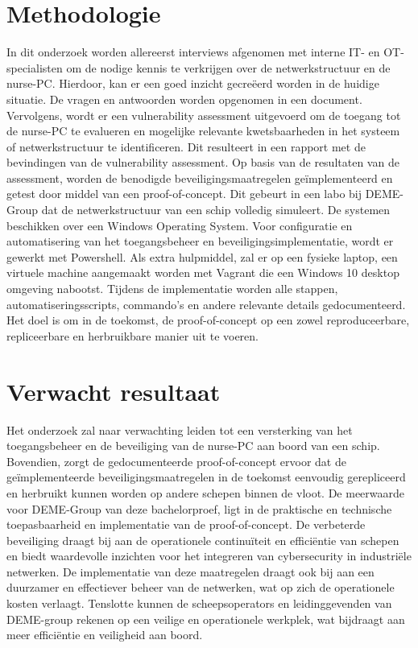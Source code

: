 \section{Methodologie}%
\label{sec:methodologie}
In dit onderzoek worden allereerst interviews afgenomen met interne IT- en OT- specialisten om de nodige kennis te verkrijgen over de netwerkstructuur en de nurse-PC.
Hierdoor, kan er een goed inzicht gecreëerd worden in de huidige situatie. De vragen en antwoorden worden opgenomen in een document.
Vervolgens, wordt er een vulnerability assessment uitgevoerd om de toegang tot de nurse-PC te evalueren en mogelijke relevante kwetsbaarheden in het systeem of netwerkstructuur te identificeren. 
Dit resulteert in een rapport met de bevindingen van de vulnerability assessment.
Op basis van de resultaten van de assessment, worden de benodigde beveiligingsmaatregelen geïmplementeerd en getest door middel van een proof-of-concept. Dit gebeurt in een labo bij DEME-Group dat de netwerkstructuur van een schip volledig simuleert.  
De systemen beschikken over een Windows Operating System. Voor configuratie en automatisering van het toegangsbeheer en beveiligingsimplementatie, wordt er gewerkt met Powershell. 
Als extra hulpmiddel, zal er op een fysieke laptop, een virtuele machine aangemaakt worden met Vagrant die een Windows 10 desktop omgeving nabootst.
Tijdens de implementatie worden alle stappen, automatiseringsscripts, commando's en andere relevante details gedocumenteerd. Het doel is om in de toekomst, de proof-of-concept op een zowel reproduceerbare, repliceerbare en herbruikbare manier uit te voeren.


\section{Verwacht resultaat}%
\label{sec:verwachte_resultaten}
Het onderzoek zal naar verwachting leiden tot een versterking van het toegangsbeheer en de beveiliging van de nurse-PC aan boord van een schip.   
Bovendien, zorgt de gedocumenteerde proof-of-concept ervoor dat de geïmplementeerde beveiligingsmaatregelen in de toekomst eenvoudig gerepliceerd en herbruikt kunnen worden op andere schepen binnen de vloot.
De meerwaarde voor DEME-Group van deze bachelorproef, ligt in de praktische en technische toepasbaarheid en implementatie van de proof-of-concept. 
De verbeterde beveiliging draagt bij aan de operationele continuïteit en efficiëntie van schepen en biedt waardevolle inzichten voor het integreren van cybersecurity in industriële netwerken. 
De implementatie van deze maatregelen draagt ook bij aan een duurzamer en effectiever beheer van de netwerken, wat op zich de operationele kosten verlaagt.
Tenslotte kunnen de scheepsoperators en leidinggevenden van DEME-group rekenen op een veilige en operationele werkplek, wat bijdraagt aan meer efficiëntie en veiligheid aan boord.



